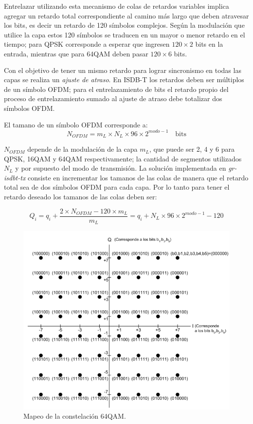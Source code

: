 Entrelazar utilizando esta mecanismo de colas de retardos variables implica agregar un retardo total correspondiente al camino más largo que deben atravesar los bits, es decir un retardo de 120 símbolos complejos. Según la modulación que utilice la capa estos 120 símbolos se traducen en un mayor o menor retardo en el tiempo; para QPSK corresponde a esperar que ingresen $120 \times 2$ bits en la entrada, mientras que para 64QAM deben pasar $120 \times 6$ bits.

Con el objetivo de tener un mismo retardo para lograr sincronismo en todas las capas se realiza un \textit{ajuste de atraso}. En ISDB-T los retardos deben ser m\'ultiplos de un s\'imbolo OFDM; para el entrelazamiento de bits el retardo propio del proceso de entrelazamiento sumado al ajuste de atraso debe totalizar dos s\'imbolos OFDM.

El tamano de un s\'imbolo OFDM corresponde a: 
\begin{equation}
N_{OFDM} = m_L \times N_L \times 96 \times 2^{modo-1} \quad \text{bits}
\end{equation}

$N_{OFDM}$ depende de la modulaci\'on de la capa $m_L$, que puede ser 2, 4 y 6 para QPSK, 16QAM y 64QAM respectivamente; la cantidad de segmentos utilizados $N_L$ y por supuesto del modo de transmisi\'on. La soluci\'on implementada en \textit{gr-isdbt-tx} consiste en incrementar los tamanos de las colas de manera que el retardo total sea de dos s\'imbolos OFDM para cada capa. Por lo tanto para tener el retardo deseado los tamanos de las colas deben ser:

\begin{equation}
Q_i = q_i + \dfrac{2 \times N_{OFDM} - 120 \times m_L}{m_L} = q_i + N_L \times 96 \times 2^{modo-1} - 120
\end{equation}

\begin{figure}[!h]
\centering
\includegraphics[scale=0.5]{figuras/cap05/constelacion_64QAM}
\caption{\label{f:mapeo_64QAM} Mapeo de la constelaci\'on 64QAM.}
\end{figure}

